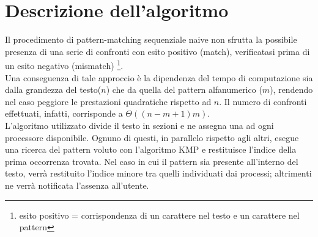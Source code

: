 \chapter{Descrizione dell'algoritmo}
Il procedimento di pattern-matching sequenziale naive non sfrutta la possibile presenza di una serie di confronti con esito positivo (match), verificatasi prima di un esito negativo (mismatch) \footnote{esito positivo = corrispondenza di un carattere nel testo e un carattere nel pattern}.\\ Una conseguenza di tale approccio è la dipendenza del tempo di computazione sia dalla grandezza del testo($n$) che da quella del pattern alfanumerico ($m$), rendendo nel caso peggiore le prestazioni quadratiche rispetto ad $n$. Il numero di confronti effettuati, infatti, corrisponde a $\Theta ((n-m+1)m)$.\\
L'algoritmo utilizzato divide il testo in sezioni e ne assegna una ad ogni processore disponibile. Ognuno di questi, in parallelo rispetto agli altri, esegue una ricerca del pattern voluto con l'algoritmo KMP e restituisce l'indice della prima occorrenza trovata. Nel caso in cui il pattern sia presente all'interno del testo, verrà restituito l'indice minore tra quelli individuati dai processi; altrimenti ne verrà notificata l'assenza all'utente.

